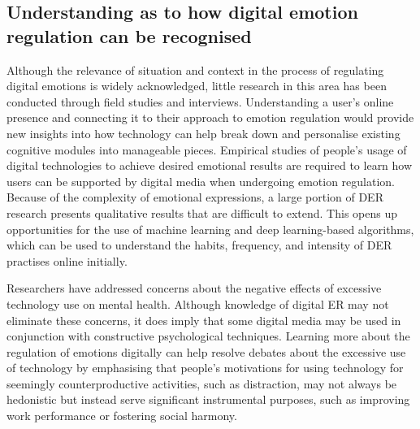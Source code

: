 \documentclass[lettersize,journal]{IEEEtran}
\begin{document}
\subsection{Understanding as to how digital emotion regulation can be recognised} Although the relevance of situation and context in the process of regulating digital emotions is widely acknowledged, little research in this area has been conducted through field studies and interviews. Understanding a user's online presence and connecting it to their approach to emotion regulation would provide new insights into how technology can help break down and personalise existing cognitive modules into manageable pieces. Empirical studies of people's usage of digital technologies to achieve desired emotional results are required to learn how users can be supported by digital media when undergoing emotion regulation. Because of the complexity of emotional expressions, a large portion of DER research presents qualitative results that are difficult to extend. This opens up opportunities for the use of machine learning and deep learning-based algorithms, which can be used to understand the habits, frequency, and intensity of DER practises online initially.

Researchers have addressed concerns about the negative effects of excessive technology use on mental health. Although knowledge of digital ER may not eliminate these concerns, it does imply that some digital media may be used in conjunction with constructive psychological techniques. Learning more about the regulation of emotions digitally can help resolve debates about the excessive use of technology by emphasising that people's motivations for using technology for seemingly counterproductive activities, such as distraction, may not always be hedonistic but instead serve significant instrumental purposes, such as improving work performance or fostering social harmony.





\end{document}
